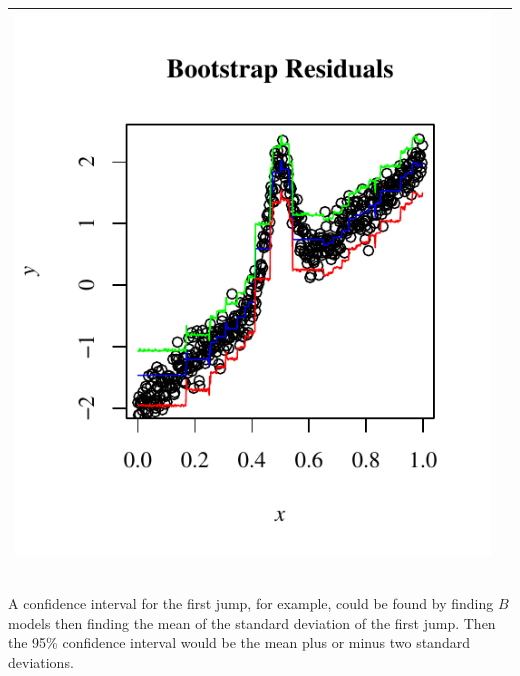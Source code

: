 \documentclass[11pt]{article}
\begin{document}
\begin{table}[h]
\begin{center}
\begin{tabular}{| >{\centering\arraybackslash}m{3in} |  >{\centering\arraybackslash}m{3in} |}
      \includegraphics[width=1\linewidth,height=0.3\textheight]{Graphs/confidenceresid2}\\\hline
    \end{tabular}
  \end{center}
\end{table}

\subsection{}

A confidence interval for the first jump, for example, could be found by finding $B$ models then finding the mean of the standard deviation of the first jump. Then the 95\% confidence interval would be the mean plus or minus two standard deviations.

\section{}

\subsection{}

\subsection{}

\subsection{}
\end{document}
